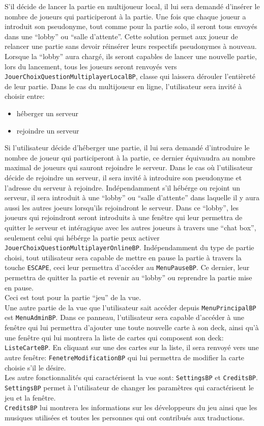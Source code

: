 S'il décide de lancer la partie en multijoueur local, il lui sera demandé d'insérer le nombre de joueurs qui participeront à la partie.
Une fois que chaque joueur a introduit son pseudonyme, tout comme pour la partie solo, il seront tous envoyés dans une \enquote{lobby} ou \enquote{salle d'attente}.
Cette solution permet aux joueur de relancer une partie sans devoir réinsérer leurs respectifs pseudonymes à nouveau.
Lorsque la \enquote{lobby} aura chargé, ils seront capables de lancer une nouvelle partie, lors du lancement, tous les joueurs seront renvoyés vers \verb|JouerChoixQuestionMultiplayerLocalBP|, classe qui laissera dérouler l'entièreté de leur partie.
Dans le cas du multijoueur en ligne, l'utilisateur sera invité à choisir entre:
\begin{itemize}
\item héberger un serveur
\item rejoindre un serveur
\end{itemize}
Si l'utilisateur décide d'héberger une partie, il lui sera demandé d'introduire le nombre de joueur qui participeront à la partie, ce dernier équivaudra au nombre maximal de joueurs qui sauront rejoindre le serveur.
Dans le cas où l'utilisateur décide de rejoindre un serveur, il sera invité à introduire son pseudonyme et l'adresse du serveur à rejoindre.
Indépendamment s'il hébérge ou rejoint un serveur, il sera introduit à une \enquote{lobby} ou \enquote{salle d'attente} dans laquelle il y aura aussi les autres joeurs lorsqu'ils rejoindront le serveur.
Dans ce \enquote{lobby}, les joueurs qui rejoindront seront introduits à une fenêtre qui leur permettra de quitter le serveur et intéragique avec les autres joueurs à travers une \enquote{chat box}, seulement celui qui hébérge la partie peux activer \verb|JouerChoixQuestionMultiplayerOnlineBP|.
Indépendamment du type de partie choisi, tout utilisateur sera capable de mettre en pause la partie à travers la touche \verb|ESCAPE|, ceci leur permettra d'accéder au \verb|MenuPauseBP|.
Ce dernier, leur permettra de quitter la partie et revenir au \enquote{lobby} ou reprendre la partie mise en pause.\\
Ceci est tout pour la partie \enquote{jeu} de la vue.\\
Une autre partie de la vue que l'utilisateur sait accéder depuis \verb|MenuPrincipalBP| est \verb|MenuAdminBP|.
Dans ce panneau, l'utilisateur sera capable d'accéder à une fenêtre qui lui permettra d'ajouter une toute nouvelle carte à son deck, ainsi qu'à une fenêtre qui lui montrera la liste de cartes qui composent son deck: \verb|ListeCarteBP|.
En cliquant sur une des cartes sur la liste, il sera renvoyé vers une autre fenêtre: \verb|FenetreModificationBP| qui lui permettra de modifier la carte choisie s'il le désire.\\
Les autre fonctionnalités qui caractérisent la vue sont: \verb|SettingsBP| et \verb|CreditsBP|.
\verb|SettingsBP| permet à l'utilisateur de changer les paramètres qui caractérisent le jeu et la fenêtre.\\
\verb|CreditsBP| lui montrera les informations sur les développeurs du jeu ainsi que les musiques utilisées et toutes les personnes qui ont contribués aux traductions.

